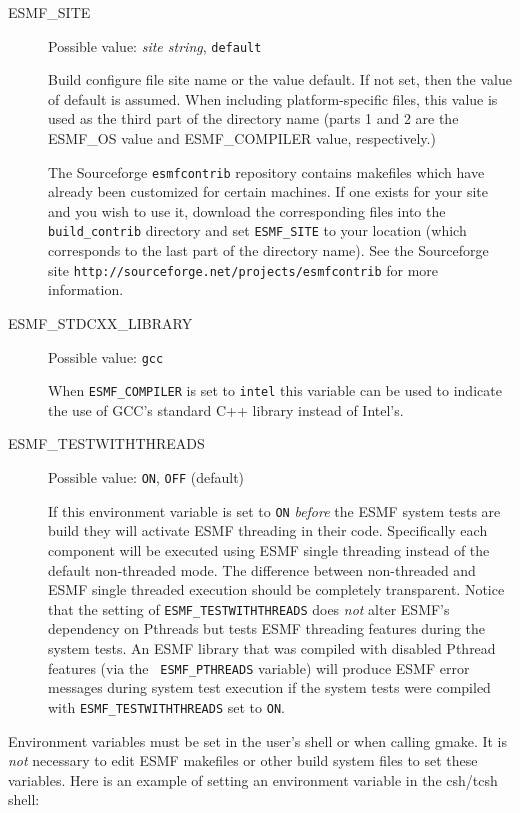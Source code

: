 \begin{description}
\item[ESMF\_SITE]
Possible value: {\em site string}, {\tt default}

Build configure file site name or the value default. If not set, then the value
of default is assumed. When including platform-specific files, this value is 
used as the third part of the directory name (parts 1 and 2 are the
ESMF\_OS value and ESMF\_COMPILER value, respectively.)

The Sourceforge {\tt esmfcontrib} repository contains makefiles which have 
already been customized for certain machines.  If one exists for your site 
and you wish to use it, download the corresponding files into the 
{\tt build\_contrib} directory and set {\tt ESMF\_SITE} to your location
(which corresponds to the last part of the directory name).  See the 
Sourceforge site {\tt http://sourceforge.net/projects/esmfcontrib} for more 
information.

\item[ESMF\_STDCXX\_LIBRARY]
Possible value: {\tt gcc}

When {\tt ESMF\_COMPILER} is set to {\tt intel} this variable can be used to
indicate the use of GCC's standard C++ library instead of Intel's.

\item[ESMF\_TESTWITHTHREADS]
Possible value: {\tt ON}, {\tt OFF} (default)

If this environment variable is set to {\tt ON} {\em before} the ESMF system
tests are build they will activate ESMF threading in their code. Specifically
each component will be executed using ESMF single threading instead of the
default non-threaded mode. The difference between non-threaded and ESMF
single threaded execution should be completely transparent. Notice that the
setting of {\tt ESMF\_TESTWITHTHREADS} does {\em not} alter ESMF's dependency
on Pthreads but tests ESMF threading features during the system tests. An
ESMF library that was compiled with disabled Pthread features (via the {\tt
ESMF\_PTHREADS} variable) will produce ESMF error messages during system test
execution if the system tests were compiled with {\tt ESMF\_TESTWITHTHREADS}
set to {\tt ON}.

\end{description}

Environment variables must be set in the user's shell or when calling gmake. It
is {\em not} necessary to edit ESMF makefiles or other build system files to set
these variables. Here is an example of setting an environment variable in the
csh/tcsh shell:

